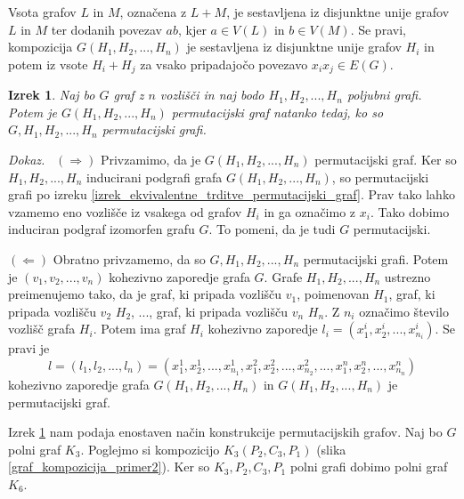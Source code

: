 \documentclass[a4paper, 12pt]{book}
\newtheorem{izrek}{Izrek}[chapter]
\newenvironment{dokaz}{\emph{Dokaz.}\ }{\hspace{\fill}{$\Box$}}
\begin{document}
Vsota grafov $L$ in $M$, označena z $L + M$, je sestavljena iz disjunktne unije grafov $L$ in $M$ ter dodanih povezav $ab$, kjer $a \in V(L)$ in $b \in V(M)$. Se pravi, kompozicija $G(H_1, H_2, ..., H_n)$ je sestavljena iz disjunktne unije grafov $H_i$ in potem iz vsote $H_i + H_j$ za vsako pripadajočo povezavo $x_ix_j \in E(G)$.

\begin{izrek}
\label{izrek_konstrukcija_permutacijskega_grafa}
    Naj bo $G$ graf z $n$ vozlišči in naj bodo $H_1, H_2, ..., H_n$ poljubni grafi. Potem je $G(H_1, H_2, ..., H_n)$ permutacijski graf natanko tedaj, ko so $G, H_1, H_2, ..., H_n$ permutacijski grafi.
\end{izrek}
\begin{dokaz}
    $(\Rightarrow)$ Privzamimo, da je $G(H_1, H_2, ..., H_n)$ permutacijski graf. Ker so $H_1, H_2, ..., H_n$ inducirani podgrafi grafa $G(H_1, H_2, ..., H_n)$, so permutacijski grafi po izreku \ref{izrek_ekvivalentne_trditve_permutacijski_graf}. Prav tako lahko vzamemo eno vozlišče iz vsakega od grafov $H_i$ in ga označimo z $x_i$. Tako dobimo induciran podgraf izomorfen grafu $G$. To pomeni, da je tudi $G$ permutacijski. 
    
    $(\Leftarrow)$ Obratno privzamemo, da so $G, H_1, H_2, ..., H_n$ permutacijski grafi. Potem je $(v_1, v_2, ..., v_n)$ kohezivno zaporedje grafa $G$. Grafe $H_1, H_2, ..., H_n$ ustrezno preimenujemo tako, da je graf, ki pripada vozlišču $v_1$, poimenovan $H_1$, graf, ki pripada vozlišču $v_2$ $H_2$, ..., graf, ki pripada vozlišču $v_n$ $H_n$. Z $n_i$ označimo število vozlišč grafa $H_i$. Potem ima graf $H_i$ kohezivno zaporedje $l_i = (x_1^i, x_2^i, ..., x_{n_i}^i)$. Se pravi je 
    \[
        l = (l_1, l_2, ..., l_n) = (x_1^1, x_2^1, ..., x_{n_1}^1, x_1^2, x_2^2, ..., x_{n_2}^2, ..., x_1^n, x_2^n, ..., x_{n_n}^n)
    \]
    kohezivno zaporedje grafa $G(H_1, H_2, ..., H_n)$ in $G(H_1, H_2, ..., H_n)$ je permutacijski graf.
\end{dokaz}

Izrek \ref{izrek_konstrukcija_permutacijskega_grafa} nam podaja enostaven način konstrukcije permutacijskih grafov. Naj bo $G$ polni graf $K_3$. Poglejmo si kompozicijo $K_3(P_2, C_3, P_1)$ (slika \ref{graf_kompozicija_primer2}). Ker so $K_3, P_2, C_3, P_1$ polni grafi dobimo polni graf $K_6$.
\end{document}
